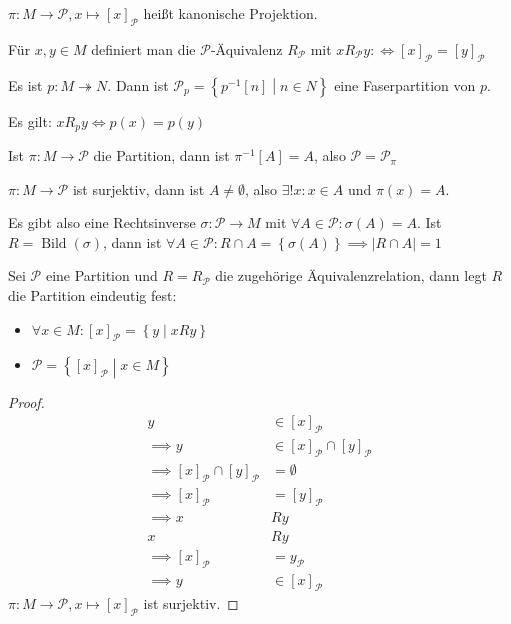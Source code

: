\begin{definition}
  $\pi: M \to \mathscr{P}, x \mapsto [x]_{\mathscr{P}}$ heißt kanonische Projektion.

  Für $x, y \in M$ definiert man die $\mathscr{P}$-Äquivalenz $R_{\mathscr{P}}$ mit $x R_{\mathscr{P}} y :\iff [x]_{\mathscr{P}} = [y]_{\mathscr{P}}$
\end{definition}
\begin{remark}
  Es ist $p: M \twoheadrightarrow N$. Dann ist $\mathscr{P}_p = \left\{ p^{-1}[n] \middle| n \in N \right\}$ eine Faserpartition von $p$.

  Es gilt: $x R_p y \iff p(x) = p(y)$

  Ist $\pi: M \to \mathscr{P}$ die Partition, dann ist $\pi^{-1}[A] = A$, also $\mathscr{P} = \mathscr{P}_{\pi}$
\end{remark}
\begin{remark}
  $\pi: M \to \mathscr{P}$ ist surjektiv, dann ist $A \ne \emptyset$, also $\exists!x: x \in A$ und $\pi(x) = A$.

  Es gibt also eine Rechtsinverse $\sigma: \mathscr{P} \to M$ mit $\forall A \in \mathscr{P}: \sigma(A) = A$. Ist $R = \operatorname{Bild}(\sigma)$, dann ist $\forall A \in \mathscr{P}: R \cap A = \left\{ \sigma(A) \right\} \implies |R \cap A| = 1$
\end{remark}
\begin{remark}
  Sei $\mathscr{P}$ eine Partition und $R = R_{\mathscr{P}}$ die zugehörige Äquivalenzrelation, dann legt $R$ die Partition eindeutig fest:
  \begin{itemize}
  \item $\forall x \in M: [x]_{\mathscr{P}} = \left\{ y \middle| x R y \right\}$
  \item $\mathscr{P} = \left\{ [x]_{\mathscr{P}} \middle| x \in M \right\}$
  \end{itemize}
\end{remark}
\begin{proof}
  \begin{align*}
    y &\in [x]_{\mathscr{P}} \\
    \implies y &\in [x]_{\mathscr{P}} \cap [y]_{\mathscr{P}} \\
    \implies [x]_{\mathscr{P}} \cap [y]_{\mathscr{P}} &= \emptyset \\
    \implies [x]_{\mathscr{P}} &= [y]_{\mathscr{P}} \\
    \implies x &R y \\
    x &R y \\
    \implies [x]_{\mathscr{P}} &= y_{\mathscr{P}} \\
    \implies y &\in [x]_{\mathscr{P}}
  \end{align*}
  $\pi: M \to \mathscr{P}, x \mapsto [x]_{\mathscr{P}}$ ist surjektiv.
\end{proof}
